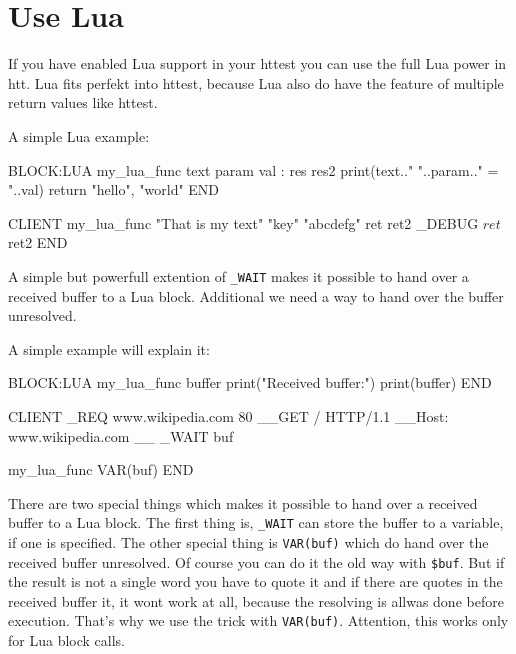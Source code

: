 \section{Use Lua}

If you have enabled Lua support in your httest you can use the full Lua
power in htt. Lua fits perfekt into httest, because Lua also do have the feature
of multiple return values like httest. 

A simple Lua example:

\begin{usplisting}
    BLOCK:LUA my_lua_func text param val : res res2
      print(text.." "..param.." = "..val)
      return "hello", "world"
    END
      
    CLIENT
      my_lua_func "That is my text" "key" "abcdefg" ret ret2
      _DEBUG $ret $ret2
    END
\end{usplisting}

A simple but powerfull extention of \texttt{\_WAIT} makes it possible to hand over a
received buffer to a Lua block. Additional we need a way to hand over the buffer
unresolved. 

A simple example will explain it:

\begin{usplisting}
    BLOCK:LUA my_lua_func buffer
      print("Received buffer:")
      print(buffer)
    END
      
    CLIENT
      _REQ www.wikipedia.com 80
      __GET / HTTP/1.1
      __Host: www.wikipedia.com
      __
      _WAIT buf
      
      my_lua_func VAR(buf)
    END
\end{usplisting}

There are two special things which makes it possible to hand over a received 
buffer to a Lua block. The first thing is, \texttt{\_WAIT} can store the buffer to a
variable, if one is specified. The other special thing is \texttt{VAR(buf)}
which do hand over the received buffer unresolved. Of course you can do it
the old way with \texttt{\$buf}. But if the result is not a single word you have
to quote it and if there are quotes in the received buffer it, it wont work at all,
because the resolving is allwas done before execution. That's why we use
the trick with \texttt{VAR(buf)}. Attention, this works only for Lua block calls.

